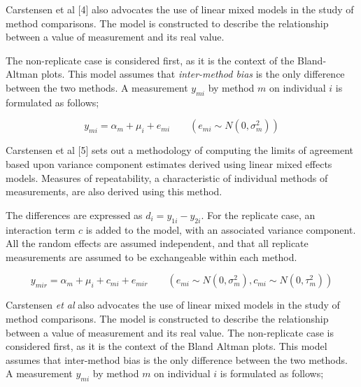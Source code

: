 \documentclass[12pt, a4paper]{report}
\theoremstyle{plain}
\theoremstyle{definition}
\theoremstyle{remark}
\begin{document}
	Carstensen et al [4] also advocates the use of linear mixed models in
	the study of method comparisons. The model is constructed to
	describe the relationship between a value of measurement and its
	real value. 
	
	The non-replicate case is considered first, as it is
	the context of the Bland-Altman plots. 
	This model assumes that
	\textit{inter-method bias} is the only difference between the two methods.
	A measurement $y_{mi}$ by method $m$ on individual $i$ is
	formulated as follows;
	
	
	\begin{equation}
	y_{mi}  = \alpha_{m} + \mu_{i} + e_{mi} \qquad ( e_{mi} \sim
	N(0,\sigma^{2}_{m}))
	\end{equation}
	
	
	
	
	Carstensen et al [5] sets out a methodology of computing the limits of
	agreement based upon variance component estimates derived using
	linear mixed effects models. 
	Measures of repeatability, a
	characteristic of individual methods of measurements, are also
	derived using this method.
	
	
	
	
	
	The differences are expressed as $d_{i} = y_{1i} - y_{2i}$.
	For the
	replicate case, an interaction term $c$ is added to the model,
	with an associated variance component. 
	All the random effects are
	assumed independent, and that all replicate measurements are
	assumed to be exchangeable within each method.
	
	
	
	\begin{equation}
	y_{mir}  = \alpha_{m} + \mu_{i} + c_{mi} + e_{mir} \qquad ( e_{mi}
	\sim N(0,\sigma^{2}_{m}), c_{mi} \sim N(0,\tau^{2}_{m}))
	\end{equation}
	
	
	
	Carstensen \textit{et al} \cite{BXC2004} also advocates the use of linear mixed models in
	the study of method comparisons. 
	The model is constructed to
	describe the relationship between a value of measurement and its
	real value.
	The non-replicate case is considered first, as it is
	the context of the Bland Altman plots. This model assumes that
	inter-method bias is the only difference between the two methods.
	A measurement $y_{mi}$ by method $m$ on individual $i$ is
	formulated as follows;
	
\end{document}
